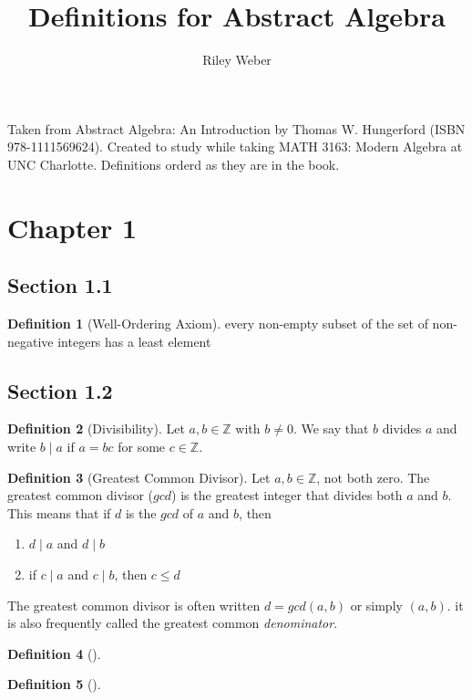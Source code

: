 \documentclass{article}
\theoremstyle{definition}
\newtheorem{definition}{Definition}[subsection]
\newcommand*{\Z}{\mathbb{Z}}
\begin{document}
\title{Definitions for Abstract Algebra}
\author{Riley Weber}
\maketitle

Taken from Abstract Algebra: An Introduction by Thomas W. Hungerford (ISBN
978-1111569624). Created to study while taking MATH 3163: Modern Algebra at UNC
Charlotte. Definitions orderd as they are in the book.

\section{Chapter 1}
\subsection{Section 1.1}

\begin{definition}[Well-Ordering Axiom] 
  every non-empty subset of the set of non-negative integers has a least 
  element
\end{definition}

\subsection{Section 1.2}
\begin{definition}[Divisibility]
  Let $a, b \in \Z$ with $b \neq 0$. We say that $b$ divides $a$ and
  write $b \mid a$ if $a=bc$ for some $c \in \Z$.
\end{definition}

\begin{definition}[Greatest Common Divisor]
  Let $a, b \in \Z$, not both zero. The greatest common divisor ($gcd$) is
  the greatest integer that divides both $a$ and $b$. This means that if $d$ is
  the $gcd$ of $a$ and $b$, then
  \begin{enumerate}
    \item $d \mid a$ and $d \mid b$
    \item if $c \mid a$ and $c \mid b$, then $c \leq d$
  \end{enumerate}
  The greatest common divisor is often written $d = gcd(a,b)$ or simply
  $(a,b)$. it is also frequently called the greatest common \emph{denominator}.
\end{definition}

\begin{definition}[]
\end{definition}

\begin{definition}[]
\end{definition}
\end{document}
